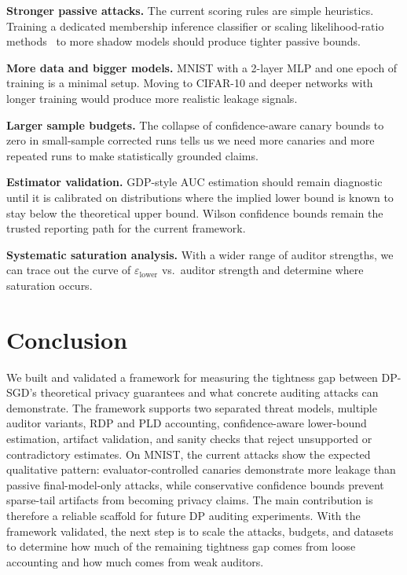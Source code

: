 \documentclass{article}
\begin{document}
\textbf{Stronger passive attacks.} The current scoring rules are simple heuristics. Training a dedicated membership inference classifier or scaling likelihood-ratio methods~\citep{carlini2022membership} to more shadow models should produce tighter passive bounds.

\textbf{More data and bigger models.} MNIST with a 2-layer MLP and one epoch of training is a minimal setup. Moving to CIFAR-10 and deeper networks with longer training would produce more realistic leakage signals.

\textbf{Larger sample budgets.} The collapse of confidence-aware canary bounds to zero in small-sample corrected runs tells us we need more canaries and more repeated runs to make statistically grounded claims.

\textbf{Estimator validation.} GDP-style AUC estimation should remain diagnostic until it is calibrated on distributions where the implied lower bound is known to stay below the theoretical upper bound. Wilson confidence bounds remain the trusted reporting path for the current framework.

\textbf{Systematic saturation analysis.} With a wider range of auditor strengths, we can trace out the curve of $\varepsilon_{\text{lower}}$ vs.\ auditor strength and determine where saturation occurs.

\section{Conclusion}

We built and validated a framework for measuring the tightness gap between DP-SGD's theoretical privacy guarantees and what concrete auditing attacks can demonstrate. The framework supports two separated threat models, multiple auditor variants, RDP and PLD accounting, confidence-aware lower-bound estimation, artifact validation, and sanity checks that reject unsupported or contradictory estimates. On MNIST, the current attacks show the expected qualitative pattern: evaluator-controlled canaries demonstrate more leakage than passive final-model-only attacks, while conservative confidence bounds prevent sparse-tail artifacts from becoming privacy claims. The main contribution is therefore a reliable scaffold for future DP auditing experiments. With the framework validated, the next step is to scale the attacks, budgets, and datasets to determine how much of the remaining tightness gap comes from loose accounting and how much comes from weak auditors.



\end{document}
